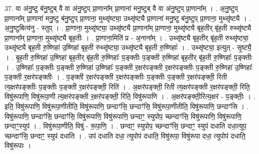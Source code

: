 \documentclass[17pt]{extarticle}
\begin{document}
37. वा अ॑नु॒ष्टु ब॑नु॒ष्टुब् वै वा अ॑नु॒ष्टुप् प्रा॒णाना᳚म् प्रा॒णाना॑ मनु॒ष्टुब् वै वा अ॑नु॒ष्टुप् प्रा॒णाना᳚म् । . अ॒नु॒ष्टुप् प्रा॒णाना᳚म् प्रा॒णाना॑ मनु॒ष्टु ब॑नु॒ष्टुप् प्रा॒णाना॒ मुथ्सृ॑ष्ट्या॒ उथ्सृ॑ष्ट्यै प्रा॒णाना॑ मनु॒ष्टु ब॑नु॒ष्टुप् प्रा॒णाना॒ मुथ्सृ॑ष्ट्यै । . अ॒नु॒ष्टुबित्य॑नु - स्तुप् । . प्रा॒णाना॒ मुथ्सृ॑ष्ट्या॒ उथ्सृ॑ष्ट्यै प्रा॒णाना᳚म् प्रा॒णाना॒ मुथ्सृ॑ष्ट्यै बृह॒तीर् बृ॑ह॒ती रुथ्सृ॑ष्ट्यै प्रा॒णाना᳚म् प्रा॒णाना॒ मुथ्सृ॑ष्ट्यै बृह॒तीः । . प्रा॒णाना॒मिति॑ प्र - अ॒नाना᳚म् । . उथ्सृ॑ष्ट्यै बृह॒तीर् बृ॑ह॒ती रुथ्सृ॑ष्ट्या॒ उथ्सृ॑ष्ट्यै बृह॒ती रु॒ष्णिहा॑ उ॒ष्णिहा॑ बृह॒ती रुथ्सृ॑ष्ट्या॒ उथ्सृ॑ष्ट्यै बृह॒ती रु॒ष्णिहाः᳚ । . उथ्सृ॑ष्ट्या॒ इत्युत् - सृ॒ष्ट्यै॒ । . बृ॒ह॒ती रु॒ष्णिहा॑ उ॒ष्णिहा॑ बृह॒तीर् बृ॑ह॒ती रु॒ष्णिहाः᳚ प॒ङ्क्तीः प॒ङ्क्ती रु॒ष्णिहा॑ बृह॒तीर् बृ॑ह॒ती रु॒ष्णिहाः᳚ प॒ङ्क्तीः । . उ॒ष्णिहाः᳚ प॒ङ्क्तीः प॒ङ्क्ती रु॒ष्णिहा॑ उ॒ष्णिहाः᳚ प॒ङ्क्ती र॒क्षर॑पङ्क्ती र॒क्षर॑पङ्क्तीः प॒ङ्क्ती रु॒ष्णिहा॑ उ॒ष्णिहाः᳚ प॒ङ्क्ती र॒क्षर॑पङ्क्तीः । . प॒ङ्क्ती र॒क्षर॑पङ्क्ती र॒क्षर॑पङ्क्तीः प॒ङ्क्तीः प॒ङ्क्ती र॒क्षर॑पङ्क्ती॒ रिती त्य॒क्षर॑पङ्क्तीः प॒ङ्क्तीः प॒ङ्क्ती र॒क्षर॑पङ्क्ती॒ रिति॑ । . अ॒क्षर॑पङ्क्ती॒ रिती त्य॒क्षर॑पङ्क्ती र॒क्षर॑पङ्क्ती॒ रिति॒ विषु॑रूपाणि॒ विषु॑रूपा॒णी त्य॒क्षर॑पङ्क्ती र॒क्षर॑पङ्क्ती॒ रिति॒ विषु॑रूपाणि । . अ॒क्षर॑पङ्क्ती॒रित्य॒क्षर॑ - प॒ङ्क्तीः॒ । . इति॒ विषु॑रूपाणि॒ विषु॑रूपा॒णीतीति॒ विषु॑रूपाणि॒ छन्दाꣳ॑सि॒ छन्दाꣳ॑सि॒ विषु॑रूपा॒णीतीति॒ विषु॑रूपाणि॒ छन्दाꣳ॑सि । . विषु॑रूपाणि॒ छन्दाꣳ॑सि॒ छन्दाꣳ॑सि॒ विषु॑रूपाणि॒ विषु॑रूपाणि॒ छन्दाꣳ॒॒ स्युपोप॒ च्छन्दाꣳ॑सि॒ विषु॑रूपाणि॒ विषु॑रूपाणि॒ छन्दाꣳ॒॒स्युप॑ । . विषु॑रूपा॒णीति॒ विषु॑ - रू॒पा॒णि॒ । . छन्दाꣳ॒॒ स्युपोप॒ च्छन्दाꣳ॑सि॒ छन्दाꣳ॒॒ स्युप॑ दधाति दधा॒त्युप॒ च्छन्दाꣳ॑सि॒ छन्दाꣳ॒॒ स्युप॑ दधाति । . उप॑ दधाति दधा॒ त्युपोप॑ दधाति॒ विषु॑रूपा॒ विषु॑रूपा दधा॒ त्युपोप॑ दधाति॒ विषु॑रूपाः । \newline
\end{document}
